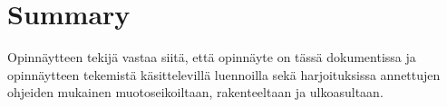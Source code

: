 \documentclass[english,12pt,a4paper,pdftex,sci,utf8]{aaltothesis}
\begin{document}
\section{Summary} 

Opinn\"aytteen tekij\"a vastaa siit\"a, ett\"a opinn\"ayte on t\"ass\"a dokumentissa
ja opinn\"aytteen tekemist\"a k\"asittelevill\"a luennoilla sek\"a
harjoituksissa annettujen ohjeiden mukainen muotoseikoiltaan,
rakenteeltaan ja ulkoasultaan.



\clearpage
\end{document}
